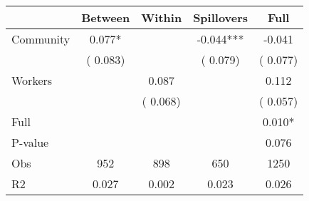 
\begin{tabular}{l*{4}{c}}\hline&\multicolumn{1}{c}{Between}&\multicolumn{1}{c}{Within}&\multicolumn{1}{c}{Spillovers}&\multicolumn{1}{c}{Full}\\ \hline
 Community             &              0.077*      &                                               &       -0.044*** &        -0.041                            \\ 
                               &        (       0.083)           &                                       &       (       0.079)     &      (       0.077)                                           \\ 
 Workers       &                                               &        0.087    &                                &             0.112                            \\ 
                               &                                               & (       0.068)                  &                                        &      (       0.057)                                           \\ 
\hline                                                                                                                                                                                                                                            
 Full                  &                                               &                                               &                                        &             0.010*                                     \\ 
 P-value               &                                               &                                               &                                        &             0.076                                           \\ 
 Obs                   &               952               &       898                       &       650                &              1250                                               \\ 
 R2                    &                      0.027              &              0.002                      &              0.023               &                     0.026                                              \\ 
\hline \end{tabular}                                                                                                                                                                                                              